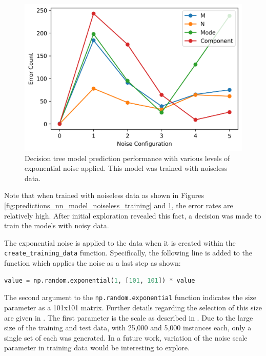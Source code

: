 \documentclass[conference]{IEEEtran}
\begin{document}
\begin{figure}
	\centering
	\includegraphics[width=1\linewidth]{images/predictions_dt_model_noiseless_training}
	\caption{Decision tree model prediction performance with various levels of exponential noise applied. This model was trained with noiseless data.}
	\label{fig:predictions_dt_model_noiseless_training}
\end{figure}

Note that when trained with noiseless data as shown in Figures \ref{fig:predictions_nn_model_noiseless_training} and \ref{fig:predictions_dt_model_noiseless_training}, the error rates are relatively high. 
After initial exploration revealed this fact, a decision was made to train the models with noisy data.

The exponential noise is applied to the data when it is created within the \verb*|create_training_data| function.
Specifically, the following line is added to the function which applies the noise as a last step as shown:

\begin{lstlisting}[language=python]
	value = np.random.exponential(1, [101, 101]) * value
\end{lstlisting}

The second argument to the \verb*|np.random.exponential| function indicates the size parameter as a 101x101 matrix.
Further details regarding the selection of this size are given in \cite{newberry_machine_2022}.
The first parameter is the scale as described  in \cite{noauthor_numpyrandomexponential_nodate}. 
Due to the large size of the training and test data, with 25,000 and 5,000 instances each, only a single set of each was generated. 
In a future work, variation of the noise scale parameter in training data would be interesting to explore.
\end{document}
